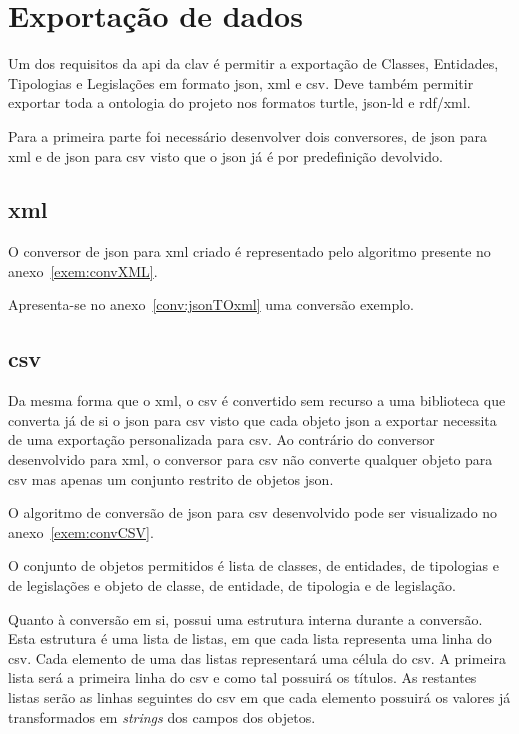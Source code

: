 \section{Exportação de dados}
Um dos requisitos da \acrshort{api} da \acrshort{clav} é permitir a exportação de Classes, Entidades, Tipologias e Legislações em formato \acrshort{json}, \acrshort{xml} e \acrshort{csv}. Deve também permitir exportar toda a ontologia do projeto nos formatos \acrshort{turtle}, \acrshort{json-ld} e \acrshort{rdf}/\acrshort{xml}.

Para a primeira parte foi necessário desenvolver dois conversores, de \acrshort{json} para \acrshort{xml} e de \acrshort{json} para \acrshort{csv} visto que o \acrshort{json} já é por predefinição devolvido.

\subsection{\acrshort{xml}}
O conversor de \acrshort{json} para \acrshort{xml} criado é representado pelo algoritmo presente no anexo~\ref{exem:convXML}.

Apresenta-se no anexo~\ref{conv:jsonTOxml} uma conversão exemplo.

\subsection{\acrshort{csv}}

Da mesma forma que o \acrshort{xml}, o \acrshort{csv} é convertido sem recurso a uma biblioteca que converta já de si o \acrshort{json} para \acrshort{csv} visto que cada objeto \acrshort{json} a exportar necessita de uma exportação personalizada para \acrshort{csv}. Ao contrário do conversor desenvolvido para \acrshort{xml}, o conversor para \acrshort{csv} não converte qualquer objeto para \acrshort{csv} mas apenas um conjunto restrito de objetos \acrshort{json}.

O algoritmo de conversão de \acrshort{json} para \acrshort{csv} desenvolvido pode ser visualizado no anexo~\ref{exem:convCSV}.

O conjunto de objetos permitidos é lista de classes, de entidades, de tipologias e de legislações e objeto de classe, de entidade, de tipologia e de legislação.

Quanto à conversão em si, possui uma estrutura interna durante a conversão. Esta estrutura é uma lista de listas, em que cada lista representa uma linha do \acrshort{csv}. Cada elemento de uma das listas representará uma célula do \acrshort{csv}. A primeira lista será a primeira linha do \acrshort{csv} e como tal possuirá os títulos. As restantes listas serão as linhas seguintes do \acrshort{csv} em que cada elemento possuirá os valores já transformados em \textit{strings} dos campos dos objetos.


